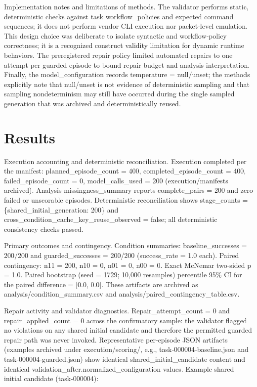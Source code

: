\documentclass[conference]{IEEEtran}
\begin{document}
Implementation notes and limitations of methods. The validator performs static, deterministic checks against task workflow\_policies and expected command sequences; it does not perform vendor CLI execution nor packet‑level emulation. This design choice was deliberate to isolate syntactic and workflow‑policy correctness; it is a recognized construct validity limitation for dynamic runtime behaviors. The preregistered repair policy limited automated repairs to one attempt per guarded episode to bound repair budget and analysis interpretation. Finally, the model\_configuration records temperature = null/unset; the methods explicitly note that null/unset is not evidence of deterministic sampling and that sampling nondeterminism may still have occurred during the single sampled generation that was archived and deterministically reused.

\section{Results}
Execution accounting and deterministic reconciliation. Execution completed per the manifest: planned\_episode\_count = 400, completed\_episode\_count = 400, failed\_episode\_count = 0, model\_calls\_used = 200 (execution/manifests archived). Analysis missingness\_summary reports complete\_pairs = 200 and zero failed or unscorable episodes. Deterministic reconciliation shows stage\_counts = \{shared\_initial\_generation: 200\} and cross\_condition\_cache\_key\_reuse\_observed = false; all deterministic consistency checks passed.

Primary outcomes and contingency. Condition summaries: baseline\_successes = 200/200 and guarded\_successes = 200/200 (success\_rate = 1.0 each). Paired contingency: n11 = 200, n10 = 0, n01 = 0, n00 = 0. Exact McNemar two‑sided p = 1.0. Paired bootstrap (seed = 1729; 10,000 resamples) percentile 95\% CI for the paired difference = [0.0, 0.0]. These artifacts are archived as analysis/condition\_summary.csv and analysis/paired\_contingency\_table.csv.

Repair activity and validator diagnostics. Repair\_attempt\_count = 0 and repair\_applied\_count = 0 across the confirmatory sample: the validator flagged no violations on any shared initial candidate and therefore the permitted guarded repair path was never invoked. Representative per‑episode JSON artifacts (examples archived under execution/scoring/, e.g., task‑000004‑baseline.json and task‑000004‑guarded.json) show identical shared\_initial\_candidate content and identical validation\_after.normalized\_configuration values. Example shared initial candidate (task‑000004):
\end{document}
